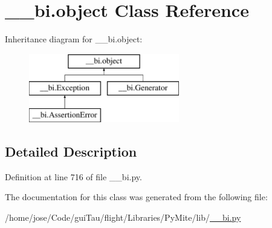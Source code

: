 \hypertarget{class____bi_1_1object}{\section{\-\_\-\-\_\-bi.\-object Class Reference}
\label{class____bi_1_1object}
}
Inheritance diagram for \-\_\-\-\_\-bi.\-object\-:\begin{figure}[H]
\begin{center}
\leavevmode
\includegraphics[height=3.000000cm]{class____bi_1_1object}
\end{center}
\end{figure}


\subsection{Detailed Description}


Definition at line 716 of file \-\_\-\-\_\-bi.\-py.



The documentation for this class was generated from the following file\-:\begin{DoxyCompactItemize}
\item 
/home/jose/\-Code/gui\-Tau/flight/\-Libraries/\-Py\-Mite/lib/\hyperlink{____bi_8py}{\-\_\-\-\_\-bi.\-py}\end{DoxyCompactItemize}
